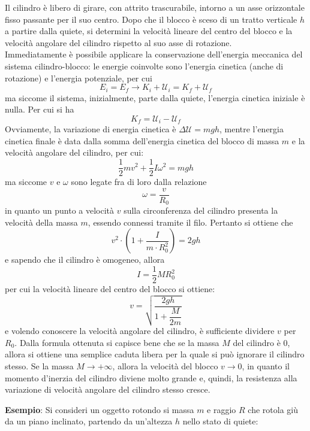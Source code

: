 \documentclass[a4paper]{extarticle}
\begin{document}
\noindent
Il cilindro è libero di girare, con attrito trascurabile, intorno a un asse orizzontale fisso passante per il suo centro. Dopo che il blocco è sceso di un tratto verticale $h$ a partire dalla quiete, si determini la velocità lineare del centro del blocco e la velocità angolare del cilindro rispetto al suo asse di rotazione.\\
Immediatamente è possibile applicare la conservazione dell'energia meccanica del sistema cilindro-blocco: le energie coinvolte sono l'energia cinetica (anche di rotazione) e l'energia potenziale, per cui
\[E_i=E_f \longrightarrow K_i+\mathcal{U}_i=K_f+\mathcal{U}_f\]
ma siccome il sistema, inizialmente, parte dalla quiete, l'energia cinetica iniziale è nulla. Per cui si ha
\[K_f=\mathcal{U}_i-\mathcal{U}_f\]
Ovviamente, la variazione di energia cinetica è $\Delta \mathcal{U}=mgh$, mentre l'energia cinetica finale è data dalla somma dell'energia cinetica del blocco di massa $m$ e la velocità angolare del cilindro, per cui:
\[\frac{1}{2}mv^2 + \frac{1}{2}I\omega^2 = mgh\]
ma siccome $v$ e $\omega$ sono legate fra di loro dalla relazione
\[\omega=\frac{v}{R_0}\]
in quanto un punto a velocità $v$ sulla circonferenza del cilindro presenta la velocità della massa $m$, essendo connessi tramite il filo. Pertanto si ottiene che
\[v^2 \cdot \left(1 + \frac{I}{m \cdot R_0^2}\right) = 2gh\]
e sapendo che il cilindro è omogeneo, allora
\[I=\frac{1}{2} M R_0^2\]
per cui la velocità lineare del centro del blocco si ottiene:
\[\boxed{v = \sqrt{\frac{2gh}{1 + \dfrac{M}{2m}}}}\]
e volendo conoscere la velocità angolare del cilindro, è sufficiente dividere $v$ per $R_0$. Dalla formula ottenuta si capisce bene che se la massa $M$ del cilindro è $0$, allora si ottiene una semplice caduta libera per la quale si può ignorare il cilindro stesso. Se la massa $M \to +\infty$, allora la velocità del blocco $v \to 0$, in quanto il momento d'inerzia del cilindro diviene molto grande e, quindi, la resistenza alla variazione di velocità angolare del cilindro stesso cresce.

\vspace{1em}
\noindent
\textbf{Esempio}: Si consideri un oggetto rotondo si massa $m$ e raggio $R$ che rotola giù da un piano inclinato, partendo da un'altezza $h$ nello stato di quiete:
\end{document}
